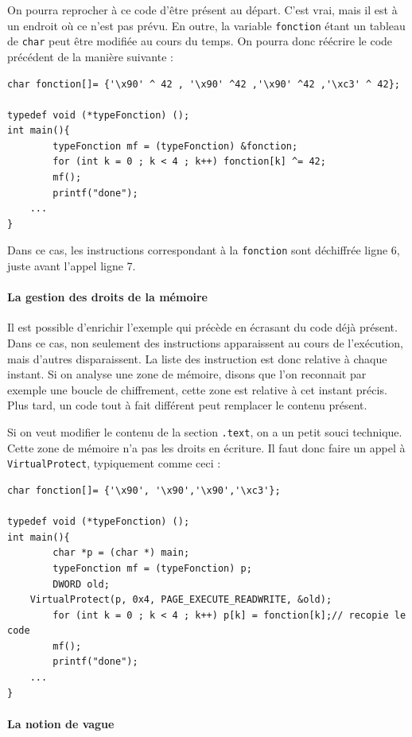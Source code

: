 \documentclass{book}
\begin{document}
On pourra reprocher à ce code d'être présent au départ. C'est vrai, mais il est à un endroit où ce n'est pas prévu. En outre, la variable {\tt fonction} étant un tableau de {\tt char} peut être modifiée au cours du temps. On pourra donc réécrire le code précédent de la manière suivante : 

\begin{verbatim}
char fonction[]= {'\x90' ^ 42 , '\x90' ^42 ,'\x90' ^42 ,'\xc3' ^ 42};

typedef void (*typeFonction) (); 
int main(){
        typeFonction mf = (typeFonction) &fonction;
        for (int k = 0 ; k < 4 ; k++) fonction[k] ^= 42;
        mf();
        printf("done");
	...
}
\end{verbatim}

Dans ce cas, les instructions correspondant à la {\tt fonction} sont déchiffrée ligne 6, juste avant l'appel  ligne 7.

\paragraph{La gestion des droits de la mémoire}

Il est possible d'enrichir l'exemple qui précède en écrasant du code déjà présent. Dans ce cas, non seulement des instructions apparaissent au cours de l'exécution, mais d'autres disparaissent. La liste des instruction est donc relative à chaque instant. Si on analyse une zone de mémoire, disons que l'on reconnait par exemple une boucle de chiffrement, cette zone est relative à cet instant précis. Plus tard, un code tout à fait différent peut remplacer le contenu présent.

Si on veut modifier le contenu de la section {\tt .text}, on a un petit souci technique. Cette zone de mémoire n'a pas les droits en écriture. Il faut donc faire un appel à {\tt VirtualProtect}, typiquement comme ceci : 

\begin{verbatim}
char fonction[]= {'\x90', '\x90','\x90','\xc3'};

typedef void (*typeFonction) (); 
int main(){
        char *p = (char *) main;
        typeFonction mf = (typeFonction) p;
        DWORD old;
	VirtualProtect(p, 0x4, PAGE_EXECUTE_READWRITE, &old);
        for (int k = 0 ; k < 4 ; k++) p[k] = fonction[k];// recopie le code
        mf();
        printf("done");
	...
}
\end{verbatim}

\paragraph{La notion de vague}
\end{document}
